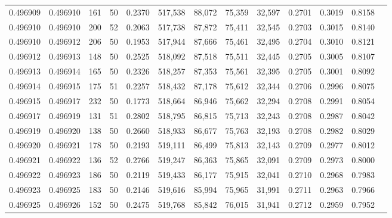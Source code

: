 \begin{tabular}{rrrrrrrrrrrrr}
0.496909 & 0.496910 &   161 &  50 &                                     0.2370 & 517,538 &  88,072 &  75,359 &  32,597 & 0.2701 & 0.3019 & 0.8158 \\
0.496910 & 0.496910 &   200 &  52 &                                     0.2063 & 517,738 &  87,872 &  75,411 &  32,545 & 0.2703 & 0.3015 & 0.8140 \\
0.496910 & 0.496912 &   206 &  50 &                                     0.1953 & 517,944 &  87,666 &  75,461 &  32,495 & 0.2704 & 0.3010 & 0.8121 \\
0.496912 & 0.496913 &   148 &  50 &                                     0.2525 & 518,092 &  87,518 &  75,511 &  32,445 & 0.2705 & 0.3005 & 0.8107 \\
0.496913 & 0.496914 &   165 &  50 &                                     0.2326 & 518,257 &  87,353 &  75,561 &  32,395 & 0.2705 & 0.3001 & 0.8092 \\
0.496914 & 0.496915 &   175 &  51 &                                     0.2257 & 518,432 &  87,178 &  75,612 &  32,344 & 0.2706 & 0.2996 & 0.8075 \\
0.496915 & 0.496917 &   232 &  50 &                                     0.1773 & 518,664 &  86,946 &  75,662 &  32,294 & 0.2708 & 0.2991 & 0.8054 \\
0.496917 & 0.496919 &   131 &  51 &                                     0.2802 & 518,795 &  86,815 &  75,713 &  32,243 & 0.2708 & 0.2987 & 0.8042 \\
0.496919 & 0.496920 &   138 &  50 &                                     0.2660 & 518,933 &  86,677 &  75,763 &  32,193 & 0.2708 & 0.2982 & 0.8029 \\
0.496920 & 0.496921 &   178 &  50 &                                     0.2193 & 519,111 &  86,499 &  75,813 &  32,143 & 0.2709 & 0.2977 & 0.8012 \\
0.496921 & 0.496922 &   136 &  52 &                                     0.2766 & 519,247 &  86,363 &  75,865 &  32,091 & 0.2709 & 0.2973 & 0.8000 \\
0.496922 & 0.496923 &   186 &  50 &                                     0.2119 & 519,433 &  86,177 &  75,915 &  32,041 & 0.2710 & 0.2968 & 0.7983 \\
0.496923 & 0.496925 &   183 &  50 &                                     0.2146 & 519,616 &  85,994 &  75,965 &  31,991 & 0.2711 & 0.2963 & 0.7966 \\
0.496925 & 0.496926 &   152 &  50 &                                     0.2475 & 519,768 &  85,842 &  76,015 &  31,941 & 0.2712 & 0.2959 & 0.7952 \\

\end{tabular}
